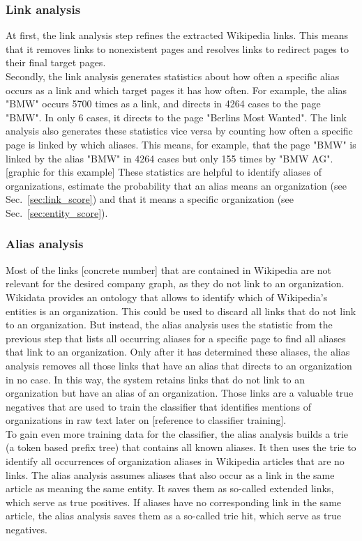 \subsubsection{Link analysis}
At first, the link analysis step refines the extracted Wikipedia links. This means that it removes links to nonexistent pages and resolves links to redirect pages to their final target pages.\\
Secondly, the link analysis generates statistics about how often a specific alias occurs as a link and which target pages it has how often. For example, the alias "BMW" occurs 5700 times as a link, and directs in 4264 cases to the page "BMW". In only 6 cases, it directs to the page "Berlins Most Wanted". The link analysis also generates these statistics vice versa by counting how often a specific page is linked by which aliases. This means, for example, that the page "BMW" is linked by the alias "BMW" in 4264 cases but only 155 times by "BMW AG". [graphic for this example] These statistics are helpful to identify aliases of organizations, estimate the probability that an alias means an organization (see Sec.~\ref{sec:link_score}) and that it means a specific organization (see Sec.~\ref{sec:entity_score}).\\

\subsubsection{Alias analysis}
\label{sec:alias_analysis}
Most of the links [concrete number] that are contained in Wikipedia are not relevant for the desired company graph, as they do not link to an organization. Wikidata provides an ontology that allows to identify which of Wikipedia's entities is an organization. This could be used to discard all links that do not link to an organization. But instead, the alias analysis uses the statistic from the previous step that lists all occurring aliases for a specific page to find all aliases that link to an organization. Only after it has determined these aliases, the alias analysis removes all those links that have an alias that directs to an organization in no case. In this way, the system retains links that do not link to an organization but have an alias of an organization. Those links are a valuable true negatives that are used to train the classifier that identifies mentions of organizations in raw text later on [reference to classifier training].\\
To gain even more training data for the classifier, the alias analysis builds a trie (a token based prefix tree) that contains all known aliases. It then uses the trie to identify all occurrences of organization aliases in Wikipedia articles that are no links. The alias analysis assumes aliases that also occur as a link in the same article as meaning the same entity. It saves them as so-called extended links, which serve as true positives. If aliases have no corresponding link in the same article, the alias analysis saves them as a so-called trie hit, which serve as true negatives.\\

